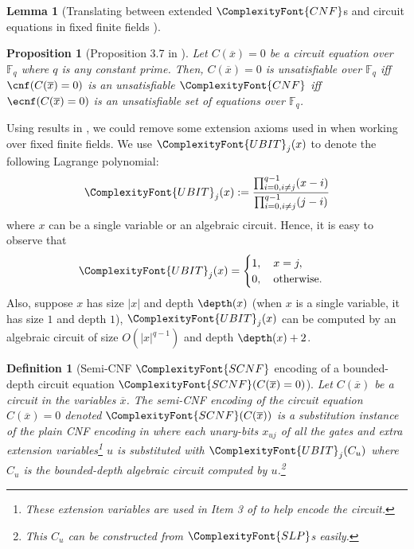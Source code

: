 \documentclass[11pt,letter]{article}
\newtheorem{lemma}[theorem]{Lemma}
\newtheorem{definition}[theorem]{Definition}
\newtheorem{proposition}[theorem]{Proposition}
\theoremstyle{remark} %
\newcommand{\CNF}{ %
    {
        \ComplexityFont{CNF}
    }
}
\newcommand{\SLP}{ %
    {
        \ComplexityFont{SLP}
    }
}
\newcommand{\SCNF}{%
    {
        \ComplexityFont{SCNF}
    }
}
\newcommand{\UBIT}{%
    {
        \ComplexityFont{UBIT}
    }
}
\begin{document}
{\begin{lemma}[Translating between extended $\CNF$s and circuit equations in fixed finite fields \cite{ST25}]
        

         
    \end{lemma}

    \begin{proposition}[Proposition 3.7 in \cite{ST25}]
        \label{prop: C <-> cnf <-> ecnf fixed finite fields}
        Let $C(\overline{x})=0$ be a circuit equation over $\mathbb{F}_q$ where $q$ is any constant prime. Then, $C(\overline{x})=0$ is unsatisfiable over $\mathbb{F}_q$ iff $\cnf(C(\overline{x})=0)$ is an unsatisfiable $\CNF$ iff $\ecnf(C(\overline{x})=0)$ is an unsatisfiable set of equations over $\mathbb{F}_q$.
    \end{proposition}

    Using results in \cite{EGLT25}, we could remove some extension axioms used in \cite{ST25} when working over fixed finite fields.
    We use $\UBIT_j(x)$ to denote the following Lagrange polynomial:
    \begin{equation}
        \label{UBITs}
        \UBIT_j(x):=
        \frac{\prod_{i=0, i \neq j}^{q-1}(x-i)}{\prod_{i=0, i \neq j}^{q-1}(j-i)}
    \end{equation}
    where $x$ can be a single variable or an algebraic circuit. Hence, it is easy to observe that
    \begin{equation*}
        \UBIT_j(x) = \begin{cases}
            1, \quad x = j,\\
            0, \quad \text{otherwise}.
        \end{cases}
    \end{equation*}
    Also, suppose $x$ has size $|x|$ and depth $\depth(x)$ (when $x$ is a single variable, it has size $1$ and depth $1$), $\UBIT_j(x)$ can be computed by an algebraic circuit of size $O(|x|^{q-1})$ and depth $\depth(x)+2$.


    \begin{definition}[Semi-CNF $\SCNF$ encoding of a bounded-depth circuit equation $\SCNF(C(\overline{x})=0)$]
        \label{def: semi-CNF encoding}
        Let $C(\overline{x})$ be a circuit in the variables $\overline{x}$. The semi-CNF encoding of the circuit equation $C(\overline{x})=0$ denoted $\SCNF(C(\overline{x}))$ is a substitution instance of the plain CNF encoding in  where each unary-bits $x_{uj}$ of all the gates and extra extension variables\footnote{These extension variables are used in Item 3 of  to help encode the circuit.} $u$ is substituted with $\UBIT_j(C_u)$ where $C_u$ is the bounded-depth algebraic circuit computed by $u$.\footnote{This $C_u$ can be constructed from $\SLP$s easily.}
    \end{definition}

}
\end{document}

